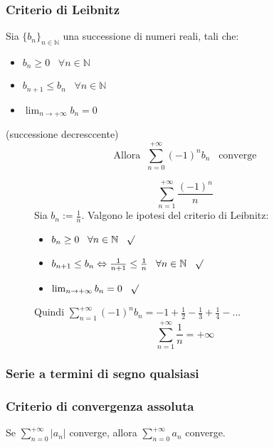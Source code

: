 \documentclass[a4paper]{article}
\theoremstyle{break}
\theoremstyle{break}
\theoremstyle{break}
\theoremstyle{break}
\begin{document}
\subsubsection{Criterio di Leibnitz}
Sia \( \{b_n\}_{n \in \mathbb{N}}  \) una successione di numeri reali, tali che:
\begin{itemize}
  \item \( b_n \ge 0\;\;\; \forall n \in \mathbb{N} \) 
  \item \( b_{n+1} \le b_n\;\;\;\forall n \in \mathbb{N} \) 
  \item \( \lim_{n \to +\infty} b_n = 0 \)
\end{itemize}
(successione decresccente)
\[
  \text{Allora}\;\; \sum_{n=0}^{+\infty} (-1)^n b_n \;\;\;\text{converge}
\] 
\begin{figure}[H]
  \begin{example}
    \[
      \sum_{n=1}^{+\infty} \frac{(-1)^n}{n}
    \] 
    Sia \( b_n := \frac{1}{n} \). Valgono le ipotesi del criterio di Leibnitz:
    \begin{itemize}
      \item \( b_n \ge 0 \;\;\; \forall n \in \mathbb{N} \;\;\; \surd\)
      \item \( b_{n+1} \le b_n \Leftrightarrow \frac{1}{n+1} \le \frac{1}{n} \;\;\;\forall n \in \mathbb{N} \;\;\; \surd \)
      \item \( \lim_{n \to +\infty} b_n =  0 \;\;\; \surd \)
    \end{itemize}
    Quindi \( \sum_{n=1}^{+\infty} (-1)^n b_n = -1 + \frac{1}{2} - \frac{1}{3} + \frac{1}{4} - \ldots \) 
    \label{D1}
    \[
      \sum_{n=1}^{+\infty} \frac{1}{n} = +\infty
    \] 
  \end{example}
\end{figure}


\subsubsection{Serie a termini di segno qualsiasi}
\subsubsection{Criterio di convergenza assoluta}
Se \( \sum_{n=0}^{+\infty} |a_n| \) converge, allora \( \sum_{n=0}^{+\infty} a_n \) converge.
\end{document}
